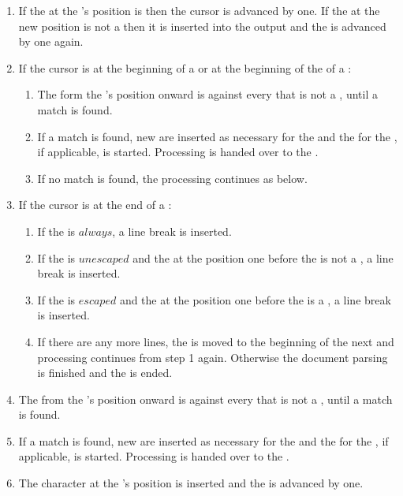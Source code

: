 \begin{enumerate}
\item If the  at the 's position is  then the cursor is advanced by one. If the  at the new position is not a  then it is inserted into the output  and the  is advanced by one again.
\item If the cursor is at the beginning of a  or at the beginning of the  of a :
  \begin{enumerate}
  \item The  form the 's position onward is  against every  that is not a , until a match is found.
  \item If a match is found, new  are inserted as necessary for the  and the  for the , if applicable, is started. Processing is handed over to the .
  \item If no match is found, the processing continues as below.
  \end{enumerate}
\item If the cursor is at the end of a :
  \begin{enumerate}
  \item If the  is \inline$always$, a line break is inserted.
  \item If the  is \inline$unescaped$ and the  at the position one before the  is not a , a line break is inserted.
  \item If the  is \inline$escaped$ and the  at the position one before the  is a , a line break is inserted.
  \item If there are any more lines, the  is moved to the beginning of the next  and processing continues from step 1 again. Otherwise the document parsing is finished and the   is ended.
  \end{enumerate}
\item The  from the 's position onward is  against every  that is not a , until a match is found.
\item If a match is found, new  are inserted as necessary for the  and the  for the , if applicable, is started. Processing is handed over to the .
\item The character at the 's position is inserted and the  is advanced by one.
\end{enumerate}



